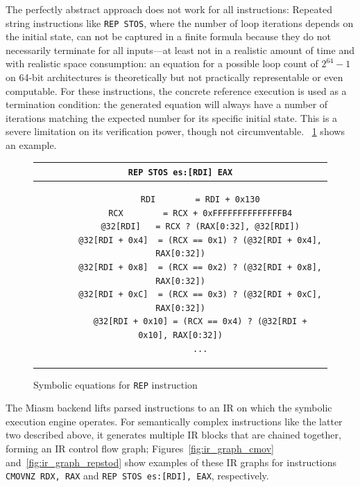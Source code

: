 The perfectly abstract approach does not work for all instructions: Repeated string instructions like \texttt{REP STOS},
where the number of loop iterations depends on the initial state, can not be captured in a finite formula because they
do not necessarily terminate for all inputs---at least not in a realistic amount of time and with realistic space
consumption: an equation for a possible loop count of $2^{64} - 1$ on 64-bit architectures is theoretically but not
practically representable or even computable. For these instructions, the concrete reference execution is used as a
termination condition: the generated equation will always have a number of iterations matching the expected number for
its specific initial state. This is a severe limitation on its verification power, though not circumventable.
\lstlistingname~\ref{fig:symb_equation_loop} shows an example.

\begin{figure}[htbp]
    \centering
    \begin{tabular}{c}
    \texttt{REP STOS es:[RDI] EAX} \\
    \midrule
    \begin{lstlisting}
        RDI        = RDI + 0x130
        RCX        = RCX + 0xFFFFFFFFFFFFFFB4
        @32[RDI]   = RCX ? (RAX[0:32], @32[RDI])
        @32[RDI + 0x4]  = (RCX == 0x1) ? (@32[RDI + 0x4],  RAX[0:32])
        @32[RDI + 0x8]  = (RCX == 0x2) ? (@32[RDI + 0x8],  RAX[0:32])
        @32[RDI + 0xC]  = (RCX == 0x3) ? (@32[RDI + 0xC],  RAX[0:32])
        @32[RDI + 0x10] = (RCX == 0x4) ? (@32[RDI + 0x10], RAX[0:32])
        ...
    \end{lstlisting}
    \end{tabular}
    \caption[]{Symbolic equations for \texttt{REP} instruction}\label{fig:symb_equation_loop}
\end{figure}

The Miasm backend lifts parsed instructions to an \ac{IR} on which the symbolic execution engine operates. For
semantically complex instructions like the latter two described above, it generates multiple \ac{IR} blocks that are
chained together, forming an \ac{IR} control flow graph; Figures~\ref{fig:ir_graph_cmov} and~\ref{fig:ir_graph_repstod}
show examples of these IR graphs for instructions \texttt{CMOVNZ RDX, RAX} and \texttt{REP STOS es:[RDI], EAX},
respectively.

